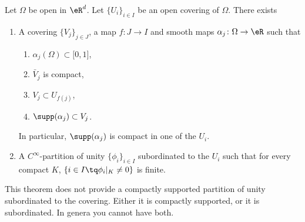\begin{theorem}      \label{THOooPCHDooITWKpC}
	Let \( \Omega\) be open in \( \eR^d\). Let \( \{ U_i \}_{i\in I}\) be an open covering of \( \Omega\). There exists
	\begin{enumerate}
		\item	 \label{ITEMooINBLooIbUpxq}
		      A covering \( \{ V_j \}_{j\in J}\), a map \(f \colon J\to I  \) and smooth maps \(\alpha_j \colon \Omega\to \eR  \) such that
		      \begin{enumerate}
			      \item
			            \( \alpha_j(\Omega)\subset\mathopen[ 0,1\mathclose]\),
			      \item
			            \( \bar V_j\) is compact,
			      \item
			            \( V_j\subset U_{f(j)}\),
			      \item
			            \( \supp(\alpha_j)\subset V_j\).
		      \end{enumerate}
		      In particular, \( \supp(\alpha_j)\) is compact in one of the \( U_i\).
		\item       \label{ITEMooFGMJooQPLqGY}
		      A \( C^{\infty}\)-partition of unity \( \{ \phi_i \}_{i\in I}\) subordinated to the \( U_i\) such that for every compact \( K\), \( \{ i\in I\tq \phi_i|_{K}\neq 0 \}\) is finite.
	\end{enumerate}
	This theorem does not provide a compactly supported partition of unity subordinated to the covering. Either it is compactly supported, or it is subordinated. In genera you cannot have both.
\end{theorem}

